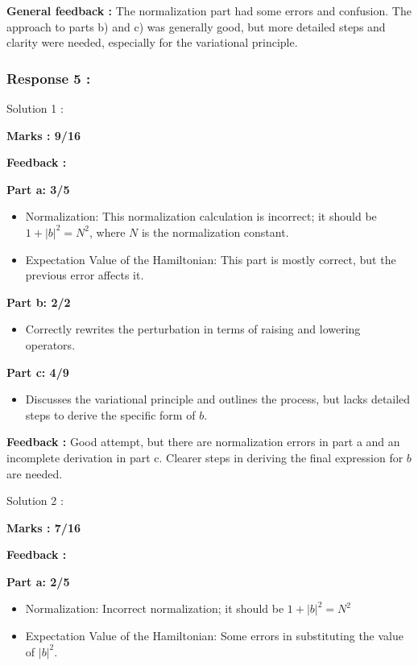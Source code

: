\documentclass[a4paper,11pt]{article}
\begin{document}
\textbf{General feedback :}
The normalization part had some errors and confusion. The approach to parts b) and c) was generally good, but more detailed steps and clarity were needed, especially for the variational principle.




\subsubsection*{Response 5 :}

Solution 1 :

\textbf{Marks : 9/16}

\textbf{Feedback :}

\textbf{Part a: 3/5}
\begin{itemize}
    \item Normalization: This normalization calculation is incorrect; it should be $1 + |b|^2 = N^2$, where $N$ is the normalization constant.
    \item Expectation Value of the Hamiltonian: This part is mostly correct, but the previous error affects it.
\end{itemize}

\textbf{Part b: 2/2}
\begin{itemize}
    \item Correctly rewrites the perturbation in terms of raising and lowering operators.
\end{itemize}

\textbf{Part c: 4/9}
\begin{itemize}
    \item Discusses the variational principle and outlines the process, but lacks detailed steps to derive the specific form of $b$.
\end{itemize}

\textbf{Feedback :}
Good attempt, but there are normalization errors in part a and an incomplete derivation in part c. Clearer steps in deriving the final expression for $b$ are needed.


Solution 2 :

\textbf{Marks : 7/16}

\textbf{Feedback :}

\textbf{Part a: 2/5}
\begin{itemize}
    \item Normalization: Incorrect normalization; it should be $1 + |b|^2 = N^2$
    \item Expectation Value of the Hamiltonian: Some errors in substituting the value of $|b|^2$.
\end{itemize}
\end{document}
